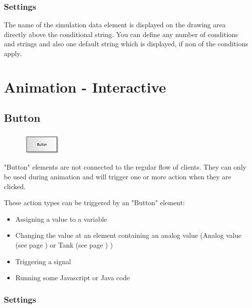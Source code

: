 \subsection*{Settings}

The name of the simulation data element is displayed on the drawing area directly above the conditional string.
You can define any number of conditions and strings and also one default string which is displayed,
if non of the conditions apply.





\chapter{Animation - Interactive}

\section{Button}
\label{ref:ModelElementInteractiveButton}

\begin{figure}
\vspace{-22pt}
\includegraphics[width=2cm]{imageModelElementInteractiveButton.png}
\vspace{-22pt}
\end{figure}

"Button" elements are not connected to the regular flow of clients.
They can only be used during animation and will trigger one or more
action when they are clicked.

These action types can be triggered by an "Button" element:

\begin{itemize}
  \item Assigning a value to a variable 
  \item Changing the value at an element containing an analog value
  (Analog value (see page \pageref{ref:ModelElementAnalogValue}) or Tank (see page \pageref{ref:ModelElementTank}) )
  \item Triggering a signal 
  \item Running some Javascript or Java code 
\end{itemize}

\subsection*{Settings}

